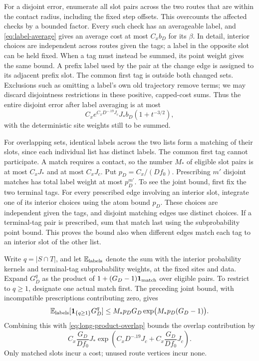 For a disjoint error, enumerate all slot pairs across the two
routes that are within the contact radius, including the fixed
step offsets.  This overcounts the affected checks by a bounded
factor.  Every such check has an averageable label, and
\eqref{eq:label-average} gives an average cost at most $C_xb_D$
for its $\beta$.  In detail, interior choices are independent
across routes given the tags; a label in the opposite slot can
be held fixed.  When a tag must instead be summed, its point
weight gives the same bound.  A prefix label used by the pair
at the change edge is assigned to its adjacent prefix slot.
The common first tag is outside both changed sets.  Exclusions
such as omitting a label's own old trajectory remove terms;
we may discard disjointness restrictions in these positive,
capped-cost sums.  Thus the entire disjoint error after label
averaging is at most
\begin{equation}\label{eq:averaged-disjoint-error}
 C_xe^{C_xD^{-.19}J_c}J_*b_D(1+t^{-3/2}),
\end{equation}
with the deterministic site weights still to be summed.

For overlapping sets, identical labels across the two lists
form a matching of their slots, since each individual list has
distinct labels.  The common first tag cannot participate.  A match
requires a contact, so the number $M_*$ of eligible slot pairs is
at most $C_xJ_*$ and at most $C_xJ_c$.  Put $p_D=C_x/(Df_0)$.
Prescribing $m'$ disjoint matches has total label weight at most
$p_D^{m'}$.  To see the joint bound, first fix the two terminal tags.
For every prescribed edge involving an interior slot, integrate one
of its interior choices using the atom bound $p_D$.  These choices
are independent given the tags, and disjoint matching edges use
distinct choices.  If a terminal-tag pair is prescribed, sum that
match last using the subprobability point bound.  This proves the
bound also when different edges match each tag to an interior slot
of the other list.

Write $q=|S\cap T|$, and let $\mathbb E_{\rm labels}$ denote the sum with
the interior probability kernels and terminal-tag subprobability
weights, at the fixed sites and data.  Expand $G_D^q$ as the product
of $1+(G_D-1)\mathbf 1_{\rm match}$ over eligible pairs.  To restrict to
$q\ge1$, designate one actual match first.  The preceding joint
bound, with incompatible prescriptions contributing zero, gives
\[
 \mathbb E_{\rm labels}[\mathbf 1_{\{q\ge1\}}G_D^q]
 \le M_*p_DG_D\exp\bigl(M_*p_D(G_D-1)\bigr).
\]
Combining this with \eqref{eq:long-product-overlap} bounds the
overlap contribution by
\begin{equation}\label{eq:averaged-overlap-error}
 C_x\frac{G_D}{Df_0}J_*
   \exp\left(C_xD^{-.19}J_c+C_x\frac{G_D}{Df_0}J_c\right).
\end{equation}
Only matched slots incur a cost; unused route vertices incur none.

